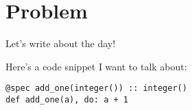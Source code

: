 \documentclass{article}
\begin{document}
\section{Problem}
Let's write about the day!

Here's a code snippet I want to talk about:

\begin{verbatim}
@spec add_one(integer()) :: integer()
def add_one(a), do: a + 1
\end{verbatim}
\end{document}
